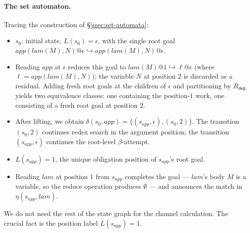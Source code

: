 \documentclass[11pt]{article}
\theoremstyle{plain}
\theoremstyle{definition}
\theoremstyle{remark}
\newcommand{\rdep}{R_{\mathsf{dep}}}
\begin{document}
\paragraph{The set automaton.}
Tracing the construction of \S\ref{ssec:set-automata}:
\begin{itemize}[leftmargin=*]
  \item $s_{0}$: initial state, $L(s_{0}) = \epsilon$, with the single
        root goal
        $\mathit{app}(\mathit{lam}(M), N)@\epsilon \hookrightarrow
         \mathit{app}(\mathit{lam}(M), N)@\epsilon$.
  \item Reading $\mathit{app}$ at $\epsilon$ reduces this goal to
        $\mathit{lam}(M)@1 \hookrightarrow \ell @\epsilon$ (where
        $\ell = \mathit{app}(\mathit{lam}(M), N)$); the variable $N$
        at position $2$ is discarded as a residual. Adding fresh
        root goals at the children of $\epsilon$ and partitioning by
        $\rdep$ yields two equivalence classes: one containing the
        position-$1$ work, one consisting of a fresh root goal at
        position $2$.
  \item After lifting, we obtain
        $\delta(s_{0}, \mathit{app}) = \{(s_{\mathit{app}}, \epsilon),
                                          (s_{0}, 2)\}$.
        The transition $(s_{0}, 2)$ continues redex search in the
        argument position; the transition $(s_{\mathit{app}},
        \epsilon)$ continues the root-level $\beta$-attempt.
  \item $L(s_{\mathit{app}}) = 1$, the unique obligation position of
        $s_{\mathit{app}}$'s root goal.
  \item Reading $\mathit{lam}$ at position $1$ from $s_{\mathit{app}}$
        completes the goal --- $\mathit{lam}$'s body $M$ is a
        variable, so the reduce operation produces $\emptyset$ --- and
        announces the match in $\eta(s_{\mathit{app}},
        \mathit{lam})$.
\end{itemize}
We do not need the rest of the state graph for the channel calculation.
The crucial fact is the position label $L(s_{\mathit{app}}) = 1$.
\end{document}
